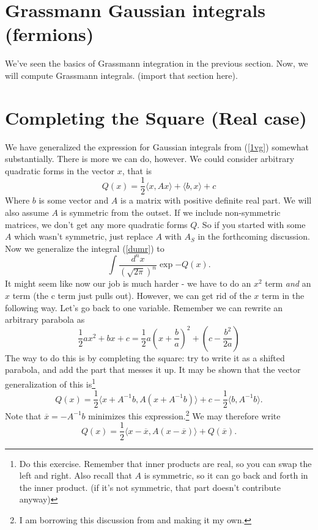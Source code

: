 \documentclass[main.tex]{subfiles}
\begin{document}
\section{Grassmann Gaussian integrals (fermions)}
We've seen the basics of Grassmann integration in the previous section. Now, we will compute Grassmann integrals. (import that section here).

\newpage
\section{Completing the Square (Real case)}
We have generalized the expression for Gaussian integrals from (\ref{1vg}) somewhat substantially. There is more we can do, however. We could consider arbitrary quadratic forms in the vector $x$, that is
\begin{equation} \label{qform}
Q(x) = \frac{1}{2} \langle x, A x \rangle + \langle b, x \rangle + c
\end{equation}
Where $b$ is some vector and $A$ is a matrix with positive definite real part. We will also assume $A$ is symmetric from the outset. If we include non-symmetric matrices, we don't get any more quadratic forms $Q$. So if you started with some $A$ which wasn't symmetric, just replace $A$ with $A_S$ in the forthcoming discussion. Now we generalize the integral (\ref{dumr}) to
\begin{equation} \label{quadint}
\int \frac{d^n x}{(\sqrt{2\pi})^n} \exp{-Q(x)}.
\end{equation}
It might seem like now our job is much harder - we have to do an $x^2$ term \textit{and} an $x$ term (the c term just pulls out). However, we can get rid of the $x$ term in the following way. Let's go back to one variable. Remember we can rewrite an arbitrary parabola as
\begin{equation} \label{grade8}
\frac{1}{2} a x^2 + bx + c = \frac{1}{2} a\left( x + \frac{b}{a} \right)^2 + \left( c - \frac{b^2}{2a} \right)
\end{equation}
The way to do this is by completing the square: try to write it as a shifted parabola, and add the part that messes it up. It may be shown that the vector generalization of this is\footnote{Do this exercise. Remember that inner products are real, so you can swap the left and right. Also recall that $A$ is symmetric, so it can go back and forth in the inner product. (if it's not symmetric, that part doesn't contribute anyway)}
\[
Q(x) = \frac{1}{2} \langle x + A^{-1}b, A \left( x + A^{-1}b\right) \rangle + c - \frac{1}{2}\langle b, A^{-1} b \rangle.
\]
Note that $\overline{x} = -A^{-1} b$ minimizes this expression.\footnote{I am borrowing this discussion from \cite{Co1} and making it my own.} We may therefore write
\[
Q(x) = \frac{1}{2} \langle x - \overline{x}, A(x - \overline{x}) \rangle + Q(\overline{x}).
\]
\end{document}
